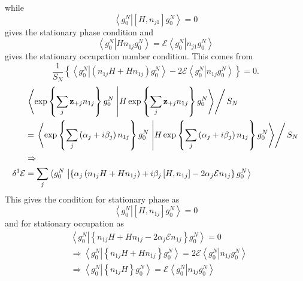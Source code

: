 \documentclass[aps,preprint]{revtex4}%
\begin{document}
while
\begin{equation}
\left\langle g_{0}^{N}\right.  \left\vert \left[  H,n_{j1}\right]  g_{0}%
^{N}\right\rangle =0
\end{equation}
gives the stationary phase condition and
\begin{equation}
\left\langle g_{0}^{N}\right.  \left\vert Hn_{1j}g_{0}^{N}\right\rangle
=\mathcal{E}\left\langle g_{0}^{N}\right.  \left\vert n_{j1}g_{0}%
^{N}\right\rangle
\end{equation}
gives the stationary occupation number condition. This comes from
\begin{equation}
\frac{1}{S_{N}}\left\{  \left\langle g_{0}^{N}\right.  \left\vert \left(
n_{1j}H+Hn_{1j}\right)  g_{0}^{N}\right\rangle -2\mathcal{E}\left\langle
g_{0}^{N}\right.  \left\vert n_{1j}g_{0}^{N}\right\rangle \right\}  =0.
\end{equation}%
\begin{align}
&  \left.  \left\langle \exp\left\{  \sum_{j}\mathbf{z}_{+j}n_{1j}\right\}
g_{0}^{N}\right.  \left\vert H\exp\left\{  \sum_{j}\mathbf{z}_{+j}%
n_{1j}\right\}  g_{0}^{N}\right\rangle \right/  S_{N}\\
&  =\left.  \left\langle \exp\left\{  \sum_{j}\left(  \alpha_{j}+i\beta
_{j}\right)  n_{1j}\right\}  g_{0}^{N}\right.  \left\vert H\exp\left\{
\sum_{j}\left(  \alpha_{j}+i\beta_{j}\right)  n_{1j}\right\}  g_{0}%
^{N}\right\rangle \right/  S_{N}\\
&  \Rightarrow\\
\delta^{1}\mathcal{E}  &  =\sum_{j}\left\langle g_{0}^{N}\right.  \left\vert
\left\{  \alpha_{j}\left(  n_{1j}H+Hn_{1j}\right)  +i\beta_{j}\left[
H,n_{1j}\right]  -2\alpha_{j}\mathcal{E}n_{1j}\right\}  g_{0}^{N}%
\right\rangle
\end{align}
This gives the condition for stationary phase as
\begin{equation}
\left\langle g_{0}^{N}\right.  \left\vert \left[  H,n_{1j}\right]  g_{0}%
^{N}\right\rangle =0
\end{equation}
and for stationary occupation as
\begin{align}
&  \left\langle g_{0}^{N}\right.  \left\vert \left\{  n_{1j}H+Hn_{1j}%
-2\alpha_{j}\mathcal{E}n_{1j}\right\}  g_{0}^{N}\right\rangle =0\\
&  \Rightarrow\left\langle g_{0}^{N}\right.  \left\vert \left\{
n_{1j}H+Hn_{1j}\right\}  g_{0}^{N}\right\rangle =2\mathcal{E}\left\langle
g_{0}^{N}\right.  \left\vert n_{1j}g_{0}^{N}\right\rangle \\
&  \Rightarrow\left\langle g_{0}^{N}\right.  \left\vert \left\{
n_{1j}H\right\}  g_{0}^{N}\right\rangle =\mathcal{E}\left\langle g_{0}%
^{N}\right.  \left\vert n_{1j}g_{0}^{N}\right\rangle
\end{align}
\end{document}

